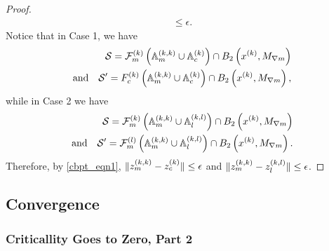 \begin{proof}
\begin{align*}
\le \epsilon.
\end{align*}
Notice that in Case 1, we have 
\begin{align*}
\mathcal S  = {\mathcal F_m^{(k)}}\left({\mathbb A_m^{(k, k)}} \cup {\mathbb A_c^{(k)}} \right) \cap B_2\left(x^{(k)}, {M_{\nabla m}}\right) \\ 
\textrm{and} \quad \mathcal S' = {F_c^{(k)}}\left({\mathbb A_m^{(k, k)}} \cup {\mathbb A_c^{(k)}} \right) \cap B_2\left(x^{(k)}, {M_{\nabla m}}\right), 
\end{align*}
while in Case 2 we have 
\begin{align*}
\mathcal S  = {\mathcal F_m^{(k)}}\left({\mathbb A_m^{(k, k)}} \cup {\mathbb A_l^{(k, l)}}\right) \cap B_2\left(x^{(k)}, {M_{\nabla m}}\right) \\
\textrm{and} \quad \mathcal S' = {\mathcal F_m^{(l)}}\left({\mathbb A_m^{(k, k)}} \cup {\mathbb A_l^{(k, l)}} \right) \cap B_2\left(x^{(k)}, {M_{\nabla m}}\right).
\end{align*}
Therefore, by \cref{cbpt_eqn1}, $\|{z_m^{(k, k)}} - {z_c^{(k)}}\| \le \epsilon$ and $\|{z_m^{(k, k)}} - {z_l^{(k, l)}}\| \le \epsilon$.
\end{proof}


\subsection{Convergence}
\label{convergence_section}


\subsubsection{Criticallity Goes to Zero, Part 2}
\label{limit_of_criticallity_to_zero}




